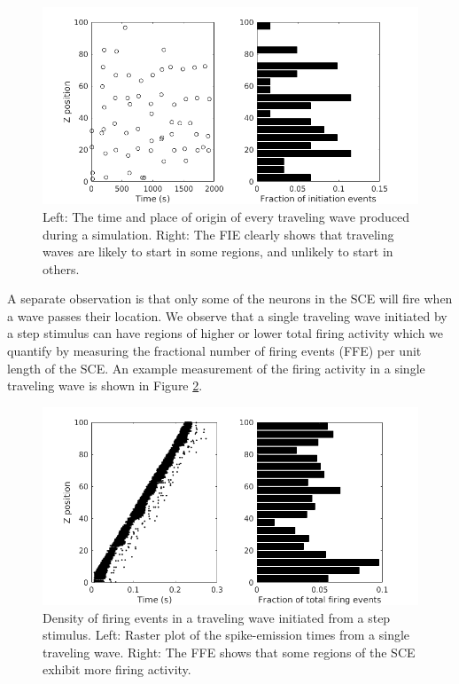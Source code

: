\documentclass[12pt]{article}
\begin{document}
\begin{figure}[!htb]
 \caption{Left: The time and place of origin of every traveling wave produced during a simulation. Right: The FIE clearly shows that traveling waves are likely to start in some regions, and unlikely to start in others.}
 \label{fig:wave_initiation_sites}
 \centering
   \includegraphics[width=\textwidth]{fig/InitiationSites_100sims}
\end{figure}

A separate observation is that only some of the neurons in the SCE will fire when a wave passes their location.
We observe that a single traveling wave initiated by a step stimulus can have regions of higher or lower total firing activity which we quantify by measuring the fractional number of firing events (FFE) per unit length of the SCE.
An example measurement of the firing activity in a single traveling wave is shown in Figure \ref{fig:wave_density}.
\begin{figure}[!htb]
 \caption{Density of firing events in a traveling wave initiated from a step stimulus. Left: Raster plot of the spike-emission times from a single traveling wave. Right: The FFE shows that some regions of the SCE exhibit more firing activity.}
 \label{fig:wave_density}
 \centering
   \includegraphics[width=\textwidth]{fig/ImpulseWaveDensity}
\end{figure}
\end{document}
